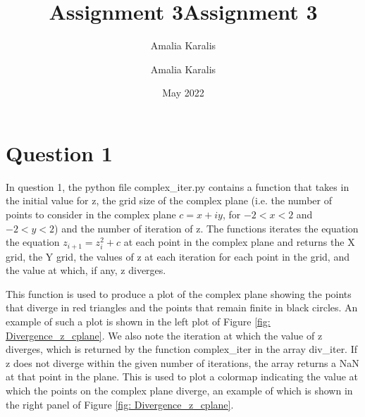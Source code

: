 \documentclass{article}
\title{Assignment 3}
\author{Amalia Karalis}
\date{May 2022}
\title{Assignment 3}
\author{Amalia Karalis}
\date{}
\begin{document}
\maketitle
\section*{Question 1}
In question 1, the python file complex\_iter.py contains a function that takes in the initial value for z, the grid size of the complex plane (i.e. the number of points to consider in the complex plane $c = x+ iy$, for $-2 < x < 2$ and $-2 < y < 2$) and the number of iteration of z.
The functions iterates the equation the equation $z_{i + 1} = z_i^2 + c$ at each point in the complex plane and returns the X grid, the Y grid, the values of z at each iteration for each point in the grid, and the value at which, if any, z diverges.

This function is used to produce a plot of the complex plane showing the points that diverge in red triangles and the points that remain finite in black circles. An example of such a plot is shown in the left plot of Figure \ref{fig: Divergence_z_cplane}. We also note the iteration at which the value of z diverges, which is returned by the function complex\_iter in the array div\_iter. If z does not diverge within the given number of iterations, the array returns a NaN at that point in the plane. This is used to plot a colormap indicating the value at which the points on the complex plane diverge, an example of which is shown in the right panel of Figure \ref{fig: Divergence_z_cplane}. 
\end{document}
